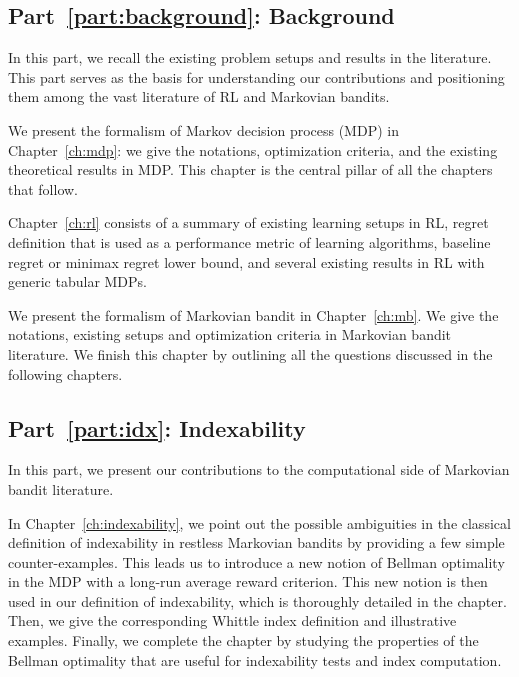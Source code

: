 \subsection{Part~{\ref{part:background}}: Background}

In this part, we recall the existing problem setups and results in the literature.
This part serves as the basis for understanding our contributions and positioning them among the vast literature of RL and Markovian bandits.

We present the formalism of Markov decision process (MDP) in Chapter~\ref{ch:mdp}: we give the notations, optimization criteria, and the existing theoretical results in MDP.
This chapter is the central pillar of all the chapters that follow.

Chapter~\ref{ch:rl} consists of a summary of existing learning setups in RL, regret definition that is used as a performance metric of learning algorithms, baseline regret or minimax regret lower bound, and several existing results in RL with generic tabular MDPs.

We present the formalism of Markovian bandit in Chapter~\ref{ch:mb}. We give the notations, existing setups and optimization criteria in Markovian bandit literature.
We finish this chapter by outlining all the questions discussed in the following chapters.

\subsection{Part~{\ref{part:idx}}: Indexability}

In this part, we present our contributions to the computational side of Markovian bandit literature.

In Chapter~\ref{ch:indexability}, we point out the possible ambiguities in the classical definition of indexability in restless Markovian bandits by providing a few simple counter-examples.
This leads us to introduce a new notion of Bellman optimality in the MDP with a long-run average reward criterion.
This new notion is then used in our definition of indexability, which is thoroughly detailed in the chapter.
Then, we give the corresponding Whittle index definition and illustrative examples.
Finally, we complete the chapter by studying the properties of the Bellman optimality that are useful for indexability tests and index computation.

